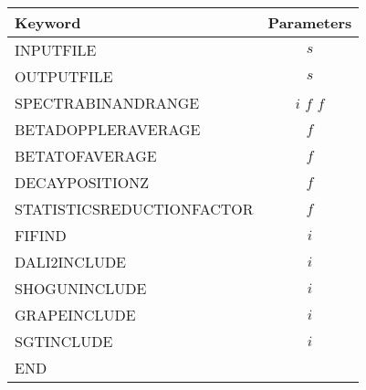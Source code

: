 \documentclass[12pt]{book}
\begin{document}
\begin{table}
  \centering
  \label{tab:RECONSTRUCTORKEY}
  \begin{tabular}{|l||c|}
    \hline
    Keyword & Parameters \\
    \hline
    \hline
    INPUTFILE                        & $s$             \\
    OUTPUTFILE                       & $s$             \\
    SPECTRABINANDRANGE               & $i$ $f$ $f$     \\
    BETADOPPLERAVERAGE               & $f$             \\
    BETATOFAVERAGE                   & $f$             \\
    DECAYPOSITIONZ                   & $f$             \\
    STATISTICSREDUCTIONFACTOR        & $f$             \\
    FIFIND                           & $i$             \\
    DALI2INCLUDE                     & $i$             \\
    SHOGUNINCLUDE                    & $i$             \\
    GRAPEINCLUDE                     & $i$             \\
    SGTINCLUDE                       & $i$             \\
    END                              &                 \\
    \hline
  \end{tabular}
\end{table}
\end{document}
